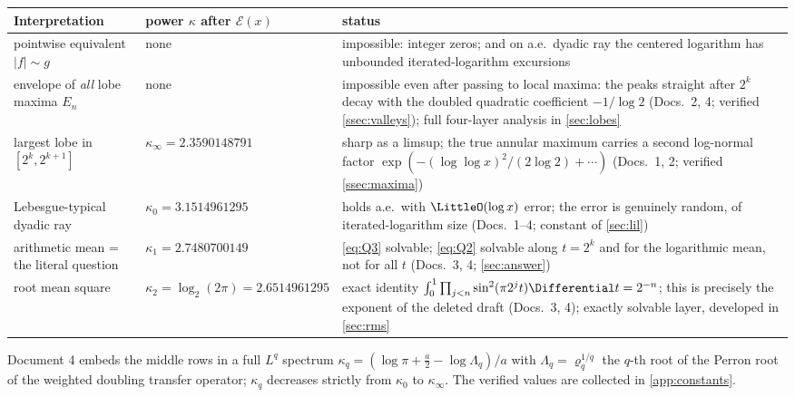 \documentclass[11pt,oneside]{article}
\theoremstyle{definition}
\theoremstyle{remark}
\begin{document}
\begin{center}
\small
\begin{tabularx}{\textwidth}{@{}>{\raggedright\arraybackslash}p{}
 >{\centering\arraybackslash}p{}X@{}}
\toprule
Interpretation & power $\kappa$ after $\mathcal E(x)$ & status \\
\midrule
pointwise equivalent $|f|\sim g$
 & none
 & impossible: integer zeros; and on a.e.\ dyadic ray the centered logarithm
   has unbounded iterated-logarithm excursions \\[0.35em]
envelope of \emph{all} lobe maxima $E_n$
 & none
 & impossible even after passing to local maxima: the peaks straight after
   $2^k$ decay with the doubled quadratic coefficient $-1/\log2$
   (Docs.~2, 4; verified \cref{ssec:valleys}); full four-layer analysis
   in \cref{sec:lobes} \\[0.35em]
largest lobe in $[2^k,2^{k+1}]$
 & $\kappa_\infty=2.3590148791$
 & sharp as a limsup; the true annular maximum carries a second log-normal
   factor $\exp(-(\log\log x)^2/(2\log2)+\cdots)$ (Docs.~1, 2; verified
   \cref{ssec:maxima}) \\[0.35em]
Lebesgue-typical dyadic ray
 & $\kappa_0=3.1514961295$
 & holds a.e.\ with $\LittleO(\log x)$ error; the error is genuinely random,
   of iterated-logarithm size (Docs.~1--4; constant of \cref{sec:lil}) \\[0.35em]
arithmetic mean = the literal question
 & $\kappa_1=2.7480700149$
 & \eqref{eq:Q3} solvable; \eqref{eq:Q2} solvable along $t=2^k$ and for the
   logarithmic mean, not for all $t$ (Docs.~3, 4; \cref{sec:answer}) \\[0.35em]
root mean square
 & $\kappa_2=\log_2(2\pi)=2.6514961295$
 & exact identity $\int_0^1\prod_{j<n}\sin^2(\pi2^jt)\Differential t=2^{-n}$; this is
   precisely the exponent of the deleted draft (Docs.~3, 4); exactly
   solvable layer, developed in \cref{sec:rms} \\
\bottomrule
\end{tabularx}
\end{center}

Document 4 embeds the middle rows in a full $L^q$ spectrum
$\kappa_q=(\log\pi+\tfrac a2-\log\Lambda_q)/a$ with
$\Lambda_q=\varrho_q^{1/q}$ the $q$-th root of the Perron root of the
weighted doubling transfer operator; $\kappa_q$ decreases strictly from
$\kappa_0$ to $\kappa_\infty$.  The verified values are collected in
\cref{app:constants}.
\end{document}
